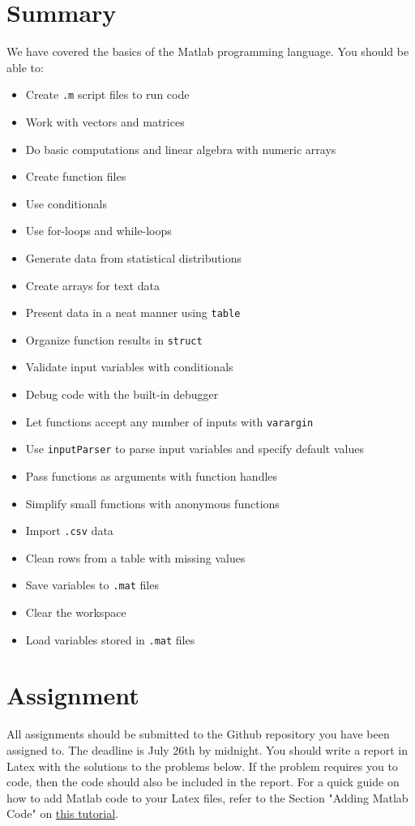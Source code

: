 \documentclass[12pt, a4paper]{article}
\begin{document}
\section{Summary}
\label{sec:org6c006f9}
We have covered the basics of the Matlab programming language.
You should be able to:
\begin{itemize}
\item Create \texttt{.m} script files to run code
\item Work with vectors and matrices
\item Do basic computations and linear algebra with numeric arrays
\item Create function files
\item Use conditionals
\item Use for-loops and while-loops
\item Generate data from statistical distributions
\item Create arrays for text data
\item Present data in a neat manner using \texttt{table}
\item Organize function results in \texttt{struct}
\item Validate input variables with conditionals
\item Debug code with the built-in debugger
\item Let functions accept any number of inputs with \texttt{varargin}
\item Use \texttt{inputParser} to parse input variables and specify default values
\item Pass functions as arguments with function handles
\item Simplify small functions with anonymous functions
\item Import \texttt{.csv} data
\item Clean rows from a table with missing values
\item Save variables to \texttt{.mat} files
\item Clear the workspace
\item Load variables stored in \texttt{.mat} files
\end{itemize}
\section{Assignment}
\label{sec:org2f29049}
All assignments should be submitted to the Github repository you have been assigned to.
The deadline is July 26th by midnight.
You should write a report in Latex with the solutions to the problems below.
If the problem requires you to code, then the code should also be included in the report.
For a quick guide on how to add Matlab code to your Latex files, refer to the Section "Adding Matlab Code" on \href{https://guilhermesalome.com/teaching/2018-empirical-methods-in-financial-econometrics/posts/lecture-1-latex.html\#org61c35bc}{this tutorial}.
\end{document}
